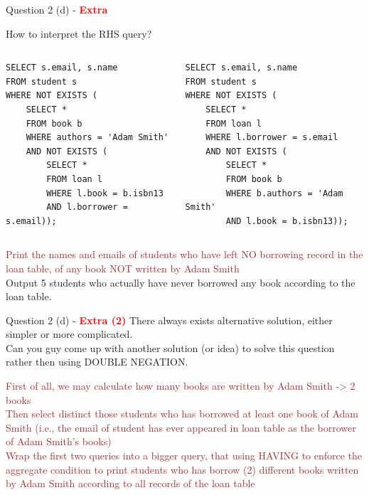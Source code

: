 \begin{frame}[fragile]{Question 2 (d) - \textcolor{red}{\textbf{Extra}}}

How to interpret the RHS query?
\begin{columns}[t]
\begin{lstlisting}[style=sql-small]
SELECT s.email, s.name
FROM student s
WHERE NOT EXISTS (
	SELECT * 
	FROM book b
	WHERE authors = 'Adam Smith' 
	AND NOT EXISTS (
		SELECT * 
		FROM loan l
		WHERE l.book = b.isbn13 
		AND l.borrower = s.email));
\end{lstlisting}

\begin{lstlisting}[style=sql-small]
SELECT s.email, s.name
FROM student s
WHERE NOT EXISTS (
	SELECT * 
	FROM loan l
	WHERE l.borrower = s.email
	AND NOT EXISTS (
		SELECT *
		FROM book b
		WHERE b.authors = 'Adam Smith'
		AND l.book = b.isbn13));
\end{lstlisting}

\end{columns}

\textcolor{brown}{Print the names and emails of students who have left NO borrowing record in the loan table, of any book NOT written by Adam Smith}\\
Output 5 students who actually have never borrowed any book according to the loan table.
\end{frame}

\begin{frame}[fragile]{Question 2 (d) - \textcolor{red}{\textbf{Extra (2)}}}
There always exists alternative solution, either simpler or more complicated.\\ \vspace{5pt}
Can you guy come up with another solution (or idea) to solve this question rather then using DOUBLE NEGATION.\\\vspace{5pt}

\textcolor{brown}{First of all, we may calculate how many books are written by Adam Smith -> 2 books}\\\vspace{5pt}
\textcolor{brown}{Then select distinct those students who has borrowed at least one book of Adam Smith (i.e., the email of student has ever appeared in loan table as the borrower of Adam Smith's books)}\\\vspace{5pt}
\textcolor{brown}{Wrap the first two queries into a bigger query, that using HAVING to enforce the aggregate condition to print students who has borrow (2) different books written by Adam Smith according to all records of the loan table}

\end{frame}

